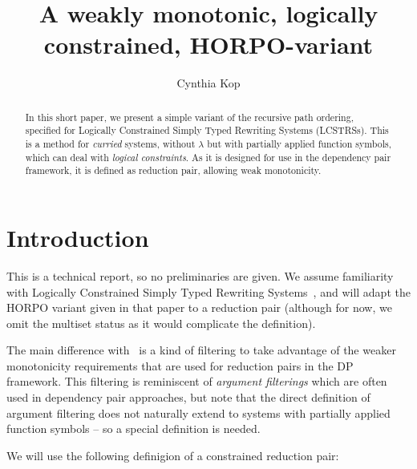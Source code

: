 \documentclass[a4paper,USenglish,cleveref,autoref,thm-restate]{lipics-v2021}
\title{A weakly monotonic, logically constrained, HORPO-variant}
\author{Cynthia Kop}{Radboud University, Nijmegen, The Netherlands}{c.kop@cs.ru.nl}{https://orcid.org/0000-0002-6337-2544}{}
\begin{document}
\maketitle

\begin{abstract}
In this short paper, we present a simple variant of the recursive path ordering, specified for
Logically Constrained Simply Typed Rewriting Systems (LCSTRSs).  This is a method for
\emph{curried} systems, without $\lambda$ but with partially applied function symbols, which can
deal with \emph{logical constraints}.  As it is designed for use in the dependency pair framework,
it is defined as reduction pair, allowing weak monotonicity.
\end{abstract}

\section{Introduction}

This is a technical report, so no preliminaries are given.
We assume familiarity with Logically Constrained Simply Typed Rewriting
Systems~\cite{guo:kop:24}, and will adapt the HORPO variant given in that paper to a reduction
pair (although for now, we omit the multiset status as it would complicate the definition).

The main difference with~\cite{guo:kop:24} is a kind of filtering to take advantage of the weaker
monotonicity requirements that are used for reduction pairs in the DP framework.  This filtering is
reminiscent of \emph{argument filterings} which are often used in dependency pair approaches, but
note that the direct definition of argument filtering does not naturally extend to systems with
partially applied function symbols -- so a special definition is needed.

We will use the following definigion of a constrained reduction pair:
\end{document}
